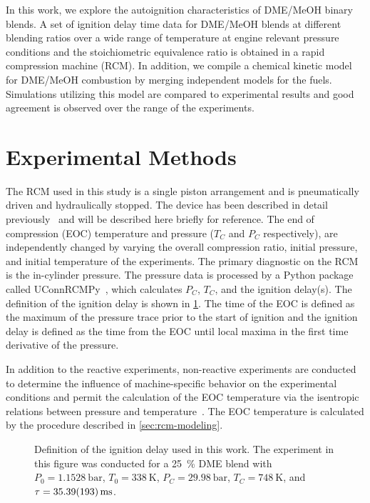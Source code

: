 \documentclass[12pt]{ussci}
\begin{document}
In this work, we explore the autoignition characteristics of DME/MeOH binary
blends. A set of ignition delay time data for DME/MeOH blends at different
blending ratios over a wide range of temperature at engine relevant pressure
conditions and the stoichiometric equivalence ratio is obtained in a rapid
compression machine (RCM). In addition, we compile a chemical kinetic model for
DME/MeOH combustion by merging independent models for the fuels. Simulations
utilizing this model are compared to experimental results and good agreement is
observed over the range of the experiments.

\section{Experimental Methods}\label{sec:experimental-methods}

The RCM used in this study is a single piston arrangement and is pneumatically
driven and hydraulically stopped. The device has been described in detail
previously~\autocite{Mittal2007a} and will be described here briefly for
reference. The end of compression (EOC) temperature and pressure (\(T_C\) and
\(P_C\) respectively), are independently changed by varying the overall
compression ratio, initial pressure, and initial temperature of the experiments.
The primary diagnostic on the RCM is the in-cylinder pressure. The pressure data
is processed by a Python package called UConnRCMPy~\autocite{uconnrcmpy}, which
calculates \(P_C\), \(T_C\), and the ignition delay(s). The definition of the
ignition delay is shown in \cref{fig:ign-delay-def}. The time of the EOC is
defined as the maximum of the pressure trace prior to the start of ignition and
the ignition delay is defined as the time from the EOC until local maxima in
the first time derivative of the pressure.

In addition to the reactive experiments, non-reactive experiments are conducted
to determine the influence of machine-specific behavior on the experimental
conditions and permit the calculation of the EOC temperature via the isentropic
relations between pressure and temperature~\autocite{Lee1998}. The EOC
temperature is calculated by the procedure described in
\cref{sec:rcm-modeling}.

\begin{figure}[htb]
    \centering
    \resizebox{0.6\textwidth}{!}{}
    \caption{Definition of the ignition delay used in this work. The
    experiment in this figure was conducted for a \SI{25}{\percent} DME blend
    with \(P_0=\SI{1.1528}{\bar}\), \(T_0=\SI{338}{\K}\),
    \(P_C=\SI{29.98}{\bar}\), \(T_C=\SI{748}{\K}\), and
    \(\tau=\SI{35.39\pm1.93}{\ms}\).}
    \label{fig:ign-delay-def}
\end{figure}
\end{document}
